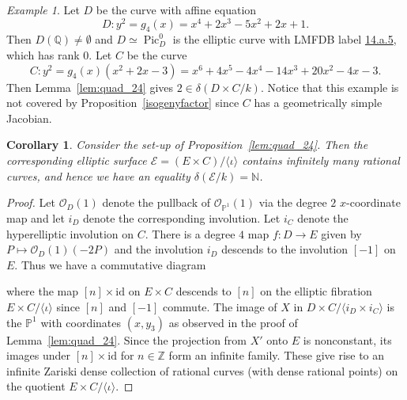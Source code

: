 \documentclass[a4paper,11pt]{amsart}
\theoremstyle{plain}
\newtheorem{coroll}[thm]{Corollary}
\theoremstyle{remark}
\newtheorem{example}[thm]{Example}
\newcommand{\bQ}{\mathbb{Q}}
\newcommand{\nn}{\mathbb{N}}
\newcommand{\pp}{\mathbb{P}}
\newcommand{\Pic}{\operatorname{Pic}}
\newcommand{\dendegs}{\delta}
\begin{document}
\begin{example} 
Let $D$ be the curve with affine equation \[D:y^2 = g_4(x)=x^4 + 2x^3 - 5x^2 + 2x + 1.\] Then $D(\bQ)\neq\emptyset$ and \(D\simeq\Pic^0_D\) is the elliptic curve with LMFDB label \href{https://www.lmfdb.org/EllipticCurve/Q/14/a/5}{14.a.5}, which has rank 0. 
Let $C$ be the curve \[C:y^2=g_4(x)(x^2 + 2x - 3)=x^6 + 4x^5 - 4x^4 - 14x^3 + 20x^2 - 4x - 3.\] Then Lemma~\ref{lem:quad_24} gives $2\in\dendegs(D\times C/k)$. Notice that this example is not covered by Proposition~\ref{isogenyfactor} since $C$ has a geometrically simple Jacobian. 
\end{example}

\begin{coroll} Consider the set-up of Proposition~\ref{lem:quad_24}. Then the corresponding elliptic surface \(\mathcal{E}=(E\times C)/\langle \iota \rangle\) contains infinitely many rational curves, and hence we have an equality $\dendegs(\mathcal{E}/k)=\nn$. 
    \end{coroll} 
    \begin{proof}
         Let \(\mathcal{O}_D(1)\) denote the pullback of \(\mathcal{O}_{\pp^1}(1)\) via the degree \(2\) \(x\)-coordinate map and let \(i_D\) denote the corresponding involution.  Let \(i_C\) denote the hyperelliptic involution on \(C\).  There is a degree \(4\) map \(f \colon D \to E\) given by \(P \mapsto \mathcal{O}_D(1)(- 2P)\) and the involution \(i_D\) descends to the involution \([-1]\) on \(E\).  Thus we have a commutative diagram
    \begin{center}
    \end{center}
    where the map \([n] \times \mathrm{id}\) on \(E \times C\) descends to \([n]\) on the elliptic fibration \(E \times C / \langle \iota \rangle\) since \([n]\) and \([-1]\) commute.
    The image of \(X\) in \(D \times C/ \langle i_D \times i_C\rangle\) is the \(\pp^1\) with coordinates \((x, y_3)\) as observed in the proof of Lemma~\ref{lem:quad_24}.  Since the projection from $X'$ onto $E$
    is nonconstant, its images under \([n] \times \mathrm{id}\) for \(n \in \mathbb{Z}\) form an infinite family.  These give rise to an infinite Zariski dense collection of rational curves (with dense rational points) on the quotient \(E \times C/\langle \iota \rangle\).
    \end{proof}
\end{document}
